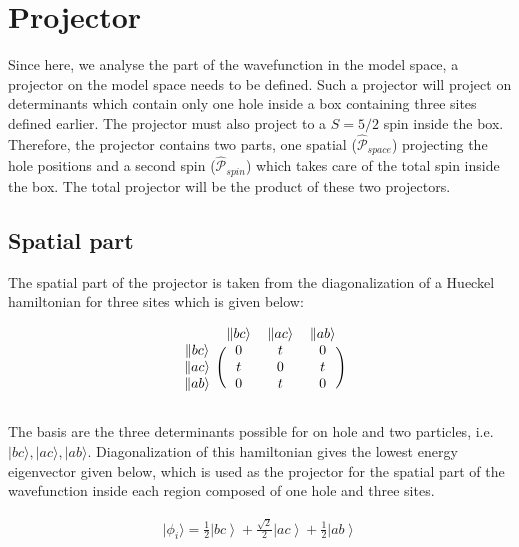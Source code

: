 \documentclass[12pt,twoside]{report}
\begin{document}
	\section{Projector}

	Since here, we analyse the part of the wavefunction in the model space, a
	projector on the model space needs to be defined. Such a projector will
	project on determinants which contain only one hole inside a box containing
	three sites defined earlier. The projector must also project to a $S=5
	\slash 2$ spin inside the box. Therefore, the projector contains two parts,
	one spatial ($\hat{\mathcal{P}}_{space}$) projecting the hole positions and
	a second spin ($\hat{\mathcal{P}}_{spin}$) which takes care of the total
	spin inside the box. The total projector will be the product of these
	two projectors.

	\subsection{Spatial part}

	The spatial part of the projector is taken from the diagonalization of a
	Hueckel hamiltonian for three sites which is given below:

	\begin{equation}
      \begin{blockarray}{cccc}
      & \|bc\rangle & \|ac\rangle & \|ab\rangle \\
      \begin{block}{c(ccc)}
        \|bc\rangle & 0 & t & 0 \\
        \|ac\rangle & t & 0 & t \\
        \|ab\rangle & 0 & t & 0 \\
      \end{block}
      \end{blockarray}
		\label{eq:demodel}
	\end{equation}

	The basis are the three determinants possible for on hole and two particles,
	i.e. $|bc\rangle,|ac\rangle,|ab\rangle$.  Diagonalization of this
	hamiltonian gives the lowest energy eigenvector given below, which is used
	as the projector for the spatial part of the wavefunction inside each region
	composed of one hole and three sites.

	\begin{equation}
		\begin{split}
		  |\phi_{i}\rangle = \frac{1}{2}\left| bc\right\rangle +
\frac{\sqrt{2}}{2}\left| ac\right\rangle +
\frac{1}{2}\left| ab\right\rangle
		\end{split}
		\label{eq:demodel}
	\end{equation}
\end{document}
